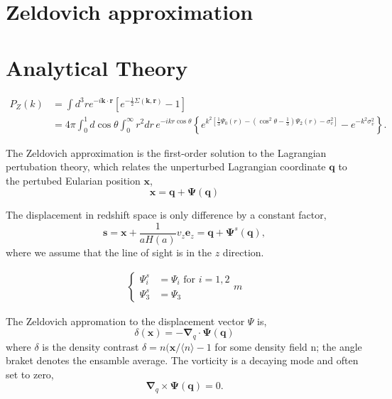\documentclass[a4paper,11pt]{article}
\begin{document}
\section{Zeldovich approximation}


\section{Analytical Theory}

\begin{equation}
\begin{split}
  P_Z(k) &= \int \! d^3 r e^{-i \bm{k}\cdot\bm{r}}
          \left[ e^{-\frac{1}{2} \Sigma(\bm{k}, \bm{r})} - 1 \right]\\
       &= 4 \pi \int_0^1 \! d\cos\theta \int_0^\infty \! r^2 dr \,
          e^{-ikr\cos\theta} \left\{
          e^{k^2\left[ \frac{1}{3} \Psi_0(r) -
                       (\cos^2\theta - \frac{1}{3}) \Psi_2(r) - \sigma_v^2
                \right]}
            - e^{-k^2 \sigma_v^2} \right\}.
\end{split}
\end{equation}

The Zeldovich approximation is the first-order solution to the
Lagrangian pertubation theory, which relates the unperturbed
Lagrangian coordinate $\bm{q}$ to the pertubed Eularian position
$\bm{x}$,
\begin{equation}
  \bm{x} = \bm{q} + \bm{\Psi}(\bm{q})
\end{equation}

The displacement in redshift space is only difference by a constant factor,
\begin{equation}
  \bm{s} = \bm{x} + \frac{1}{aH(a)} v_z \bm{e}_z
         = \bm{q} + \bm{\Psi}^s(\bm{q}),
\end{equation}
where we assume that the line of sight is in the $z$ direction.

\begin{align}
  \begin{cases}
  \Psi_i^s &= \Psi_i \mbox{  for $i=1,2$}\\
  \Psi_3^s &= \Psi_3
  \end{cases}m
\end{align}

The Zeldovich appromation to the displacement vector $\Psi$ is,
\begin{equation}
  \delta(\bm{x}) = - \bm{\nabla}_q \cdot \bm{\Psi}(\bm{q})
\end{equation}
where $\delta$ is the density contrast $\delta = n(\bm{x}/\langle n
\rangle - 1$ for some density field n; the angle braket denotes the
ensamble average. The vorticity is a decaying mode and often set to zero,
\begin{equation}
  \bm{\nabla}_q \times \bm{\Psi}(\bm{q}) = 0.
\end{equation}
\end{document}
